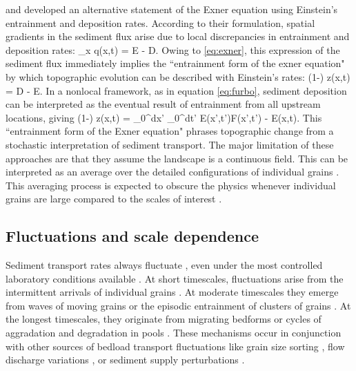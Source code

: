 \citet{Nakagawa1976} and \citet{Tsujimoto1978} developed an alternative statement of the Exner equation using Einstein's entrainment and deposition rates.
According to their formulation, spatial gradients in the sediment flux arise due to local discrepancies in entrainment and deposition rates:
\be \partial_x q(x,t) = E - D. \ee 
Owing to \ref{eq:exner}, this expression of the sediment flux immediately implies the ``entrainment form of the exner equation" \citep{Parker2000,Furbish2012,Fathel2015,Furbish2017} by which topographic evolution can be described with Einstein's rates: 
\be (1-\phi) \px z(x,t) = D - E.\ee
In a nonlocal framework, as in equation \ref{eq:furbo}, sediment deposition can be interpreted as the eventual result of entrainment from all upstream locations, giving
\be (1-\phi) \px z(x,t) = \int_0^\infty dx' \int_0^\infty dt' E(x',t')F(x',t') - E(x,t). \ee
This ``entrainment form of the Exner equation" \citep{Furbish2017} phrases topographic change from a stochastic interpretation of sediment transport.
The major limitation of these approaches are that they assume the landscape is a continuous field. This can be interpreted as an average over the detailed configurations of individual grains \citep{Coleman2009}. This averaging process is expected to obscure the physics whenever individual grains are large compared to the scales of interest \citep[e.g.][]{Schobe2021}.

\subsection{Fluctuations and scale dependence}

Sediment transport rates always fluctuate \citep{Kuhnle1988,Hoey1992,Recking2012}, even under the most controlled laboratory conditions available \citep{Ancey2006,Roseberry2012}.
At short timescales, fluctuations arise from the intermittent arrivals of individual grains \citep{Bohm2004,Ballio2018}. At moderate timescales they emerge from waves of moving grains \citep{Heyman2014} or the episodic entrainment of clusters of grains \citep{Strom2004,Papanicolaou2018}. At the longest timescales, they originate from migrating bedforms \citep{Guala2014} or cycles of aggradation and degradation in pools \citep{Dhont2018}. These mechanisms occur in conjunction with other sources of bedload transport fluctuations like grain size sorting \citep{Iseya1987,Cudden2003}, flow discharge variations \citep{Wong2006,Mao2012,Redolfi2018}, or sediment supply perturbations \citep{Lisle1993,Madej2009,Elgueta-Astaburuaga2019}.

